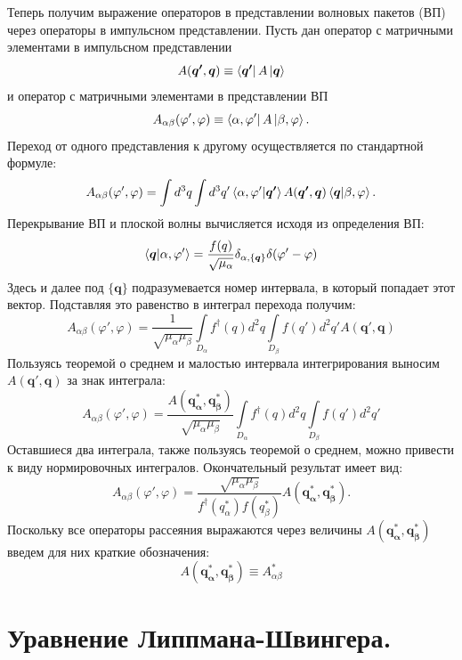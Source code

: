 \documentclass[a4paper,12pt]{article}
\newcommand{\vect}[1]{\boldsymbol{#1}}
\begin{document}
Теперь получим выражение операторов в представлении волновых пакетов (ВП) через операторы в импульсном представлении. Пусть дан оператор с матричными элементами в импульсном представлении
\[
	A(\vect{q'},\vect{q}) \equiv \bra{\vect{q'}}A\ket{\vect{q}}
\] и оператор с матричными элементами в представлении ВП \[
  A_{\alpha\beta}(\varphi',\varphi) \equiv \bra{\alpha,\varphi'}A\ket{\beta,\varphi}.
\]
Переход от одного представления к другому осуществляется по стандартной формуле:
\[
	A_{\alpha\beta}(\varphi',\varphi) = \int d^3q \int d^3q' \braket{\alpha,\varphi'|\vect{q'}} A(\vect{q'},\vect{q}) \braket{\vect{q}|\beta,\varphi}.
\] 
Перекрывание ВП и плоской волны вычисляется исходя из определения ВП:
\[
 \braket{\vect{q}|\alpha,\varphi'} = \frac{f(q)}{\sqrt{\mu_\alpha}} \delta_{\alpha,\{\vect{q}\}} \delta(\varphi'-\varphi)
\]
Здесь и далее под $\{\vect{q}\}$ подразумевается номер интервала, в который попадает этот вектор. Подставляя это равенство в интеграл перехода получим:
\[
 A_{\alpha\beta}(\varphi',\varphi) = \frac{1}{\sqrt{\mu_\alpha \mu_\beta}} \int\limits_{D_\alpha} f^\dagger(q) d^2q \int\limits_{D_\beta} f(q') d^2q' A(\vect{q'},\vect{q})
\] Пользуясь теоремой о среднем и малостью интервала интегрирования выносим $A(\vect{q'},\vect{q})$ за знак интеграла:
\[
 A_{\alpha\beta}(\varphi',\varphi) = \frac{A(\vect{q^*_\alpha},\vect{q^*_\beta})}{\sqrt{\mu_\alpha \mu_\beta}} \int\limits_{D_\alpha} f^\dagger(q) d^2q \int\limits_{D_\beta} f(q') d^2q'
\] Оставшиеся два интеграла, также пользуясь теоремой о среднем, можно привести к виду нормировочных интегралов. Окончательный результат имеет вид:
\[
 A_{\alpha\beta}(\varphi',\varphi) = \frac{\sqrt{\mu_\alpha \mu_\beta}}{ f^\dagger(q_\alpha^*)f(q_\beta^*) }  A(\vect{q^*_\alpha},\vect{q^*_\beta}).
\]
Поскольку все операторы рассеяния выражаются через величины $A(\vect{q^*_\alpha},\vect{q^*_\beta})$ введем для них краткие обозначения:
\begin{equation}
    \label{mesh_oper}
    A(\vect{q^*_\alpha},\vect{q^*_\beta}) \equiv A^*_{\alpha\beta}
\end{equation}




\newline
\section{Уравнение Липпмана-Швингера.}
\end{document}
